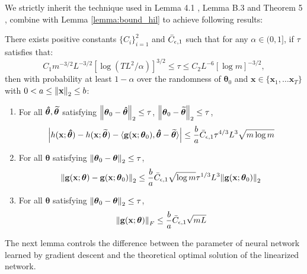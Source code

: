 We strictly inherit the technique used in Lemma 4.1 \cite{cao2019generalization}, Lemma B.3 \cite{cao2019generalization} and Theorem 5 \cite{allen2019convergence}, combine with Lemma \ref{lemma:bound_hil} to achieve following results:
\begin{sublemma}
\label{lemma:NTK_related_bounds}
There exists positive constants $\{C_i\}^2_{i=1}$ and $\Bar{C}_{\epsilon,1}$ such that for any $\alpha  \in (0,1]$, if $\tau$ satisfies that:
\[C_{1}m^{-3/2}L^{-3/2}\left[\log(T L^2/\alpha)\right]^{3/2}\leq\tau\leq C_{2}L^{-6}[\log m]^{-3/2},\] then with probability at least $1-\alpha$ over the randomness of $\boldsymbol{\theta}_0$ and $\mathbf{x} \in \{\mathbf{x}_1, \dots \mathbf{x}_T\}$ with $0<  a \le \norm{\mathbf{x}}_2 \le b$:
\begin{enumerate}
    \item For all  $\boldsymbol{\Hat{\theta}}, \boldsymbol{\widetilde{\theta}}$  satisfying $\norm{\boldsymbol{\theta}_0 -  \boldsymbol{\Hat{\theta}}}_2 \le \tau$, $\norm{\boldsymbol{\theta}_0 -  \boldsymbol{\widetilde{\theta}}}_2 \leq \tau$, 
    \[\left \lvert h(\mathbf{x};\boldsymbol{\Hat \theta}) - h(\mathbf{x}; \boldsymbol{\widetilde{\theta}}) - \langle \mathbf{g}(\mathbf{x}; \boldsymbol{\theta}_0), \boldsymbol{\Hat \theta} - \boldsymbol{\widetilde{\theta}} \rangle  \right\rvert  \leq  \frac{b}{a} \Bar{C}_{\epsilon,1}   \tau^{4/3}L^{3}\sqrt{m\log m}\]
    \label{res:true_f_vs_linear}
    
    \item For all  $\boldsymbol{\theta}$  satisfying $\norm{\boldsymbol{\theta}_0 -  \boldsymbol{\theta}}_2 \le \tau$, 
    \[ \norm{\mathbf{g}(\mathbf{x}; \boldsymbol{\theta}) - \mathbf{g}(\mathbf{x}; \boldsymbol{\theta}_0)}_2 \leq \frac{b}{a} \Bar{C}_{\epsilon,1} \sqrt{\log m}\tau^{1/3}L^{3} \norm{\mathbf{g}(\mathbf{x};\boldsymbol{\theta}_0)}_2\]
    
    \label{res:grad_diff_bound}
    
    \item For all  $\boldsymbol{\theta}$  satisfying $\norm{\boldsymbol{\theta}_0 -  \boldsymbol{\theta}}_2 \le \tau$, 
    \[\norm{\mathbf{g}(\mathbf{x};\boldsymbol{\theta})}_F \leq \frac{b}{a} \Bar{C}_{\epsilon,1} \sqrt{mL}\] 
    
    \label{res:grad_bound}
\end{enumerate}
\end{sublemma}
The next lemma controls the difference between the
parameter of neural network learned by gradient descent and the theoretical optimal solution of the linearized network. 


